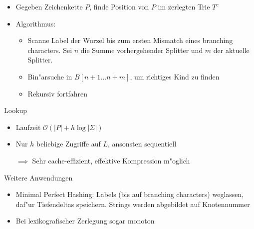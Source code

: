 \documentclass[ngerman,hyperref={pdfpagelabels=true}]{beamer}
\begin{document}
\begin{frame}
\centering



\begin{itemize}
\item Gegeben Zeichenkette $P$, finde Position von $P$ im zerlegten Trie $T^c$
\item Algorithmus:
\begin{itemize}
\item Scanne Label der Wurzel bis zum ersten Mismatch eines branching characters.
Sei $n$ die Summe vorhergehender Splitter und $m$ der aktuelle Splitter.
\item Bin"arsuche in $B[n+1 \ldots n+m]$, um richtiges Kind zu finden
\item Rekursiv fortfahren
\end{itemize}

\end{itemize}
\end{frame}

\begin{frame}
\begin{block}{Lookup}
\begin{itemize}
\item Laufzeit $\mathcal{O}\left(|P| + h\log |\Sigma|\right)$
\item Nur $h$ beliebige Zugriffe auf $L$, ansonsten sequentiell
\item[$\implies$] Sehr cache-effizient, effektive Kompression m"oglich
\end{itemize}
\end{block}

\begin{block}{Weitere Anwendungen}
\begin{itemize}
\item Minimal Perfect Hashing: Labels (bis auf branching characters) weglassen, daf"ur
Tiefendeltas speichern. Strings werden abgebildet auf Knotennummer
\item Bei lexikografischer Zerlegung sogar monoton
\end{itemize}
\end{block}
\end{frame}
\end{document}
